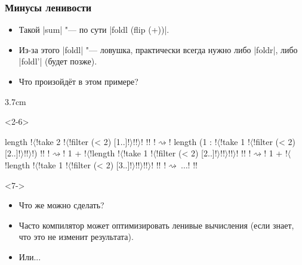 \documentclass[11pt]{beamer}
\begin{document}
\begin{frame}[fragile]
  \frametitle{Минусы ленивости}
  \begin{itemize}
    \item Такой \haskinline|sum| "--- по сути \haskinline|foldl (flip (+))|.
    \item Из-за этого \haskinline|foldl| "--- ловушка, практически всегда нужно либо \haskinline|foldr|, либо \haskinline|foldl'| (будет позже).
    \item<2-> Что произойдёт в этом примере?
  \end{itemize}
  \begin{overlayarea}{\textwidth}{3.7cm}
    \begin{onlyenv}<2-6>
      \begin{haskellsmall}
        length !$\langle$!take 2 !$\langle$!filter (< 2) [1..]!$\rangle$!!$\rangle$! !! !$\rightsquigarrow$!
        length (1 : !$\langle$!take 1 !$\langle$!filter (< 2) [2..]!$\rangle$!!$\rangle$!) !! !$\rightsquigarrow$!
        1 + !$\langle$!length !$\langle$!take 1 !$\langle$!filter (< 2) [2..]!$\rangle$!!$\rangle$!!$\rangle$! !! !$\rightsquigarrow$!
        1 + !$\langle$!length !$\langle$!take 1 !$\langle$!filter (< 2) [3..]!$\rangle$!!$\rangle$!!$\rangle$! !! !$\rightsquigarrow\ \ldots$! !!
      \end{haskellsmall}
    \end{onlyenv}
    \begin{onlyenv}<7->
      \begin{itemize}
        \item Что же можно сделать?
        \item Часто компилятор может оптимизировать ленивые вычисления (если знает, что это не изменит результата).
        \item Или...
      \end{itemize}
    \end{onlyenv}
  \end{overlayarea}
\end{frame}
\end{document}
